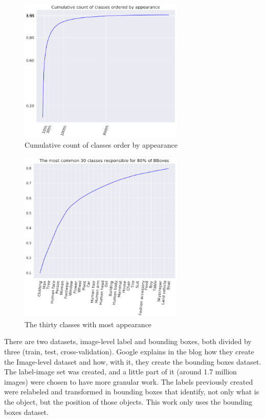 \documentclass[11pt, a4paper, onecolumn]{article}
\begin{document}
\begin{figure}[!ht]
	\centering
	\includegraphics[width=0.7\textwidth]{cumulative-classes.png}
	\caption{\scriptsize Cumulative count of classes order by appearance}
\end{figure}

\begin{figure}[!ht]
	\centering
	\includegraphics[width=0.7\textwidth]{30-most-frequently.png}
	\caption{\scriptsize The thirty classes with most appearance}
\end{figure}

There are two datasets, image-level label and bounding boxes, both divided by three (train, test, cross-validation). Google explains in the blog \cite{imgdataset} how they create the Image-level dataset and how, with it, they create the bounding boxes dataset. The label-image set was created, and a little part of it (around 1.7 million images) were chosen to have more granular work. The labels previously created were relabeled and transformed in bounding boxes that identify, not only what is the object, but the position of those objects. This work only uses the bounding boxes dataset.
\end{document}
